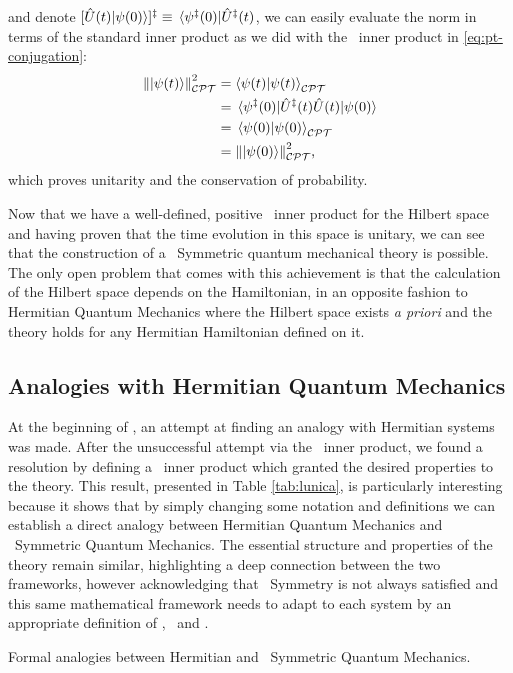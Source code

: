             and denote $\bqty*{\hU\pqty{t}\!\ket{\psi\pqty{0}}}\!^\myconj \equiv \bra*{\psi^\myconj\pqty{0}}\!\hU^\myconj\pqty{t}$, we can easily evaluate the norm in terms of the standard inner product as we did with the \PT\ inner product in \eqref{eq:pt-conjugation}:
            \begin{align*}
                \norm{\ket{\psi\pqty{t}}}^2_{\CPT}
                &= \braket{\psi{\pqty{t}}}{\psi\pqty{t}}_{\CPT} \\
                &= \bra*{\psi^\myconj\pqty{0}}\! \hU^\myconj\pqty{t} \hU\pqty{t} \!\ket{\psi\pqty{0}} \\
                &= \bra*{\psi\pqty{0}}\ket{\psi\pqty{0}}_{\CPT} \\
                &= \norm{\ket{\psi\pqty{0}}}^2_{\CPT}
                \mycomma
            \end{align*}
            which proves unitarity and the conservation of probability.

            Now that we have a well-defined, positive \CPT\ inner product for the Hilbert space and having proven that the time evolution in this space is unitary, we can see that the construction of a \PT\ Symmetric quantum mechanical theory is possible. The only open problem that comes with this achievement is that the calculation of the Hilbert space depends on the Hamiltonian, in an opposite fashion to Hermitian Quantum Mechanics where the Hilbert space exists \emph{a priori} and the theory holds for any Hermitian Hamiltonian defined on it.

        \subsection{Analogies with Hermitian Quantum Mechanics}
        At the beginning of , an attempt at finding an analogy with Hermitian systems was made. After the unsuccessful attempt via the \PT\ inner product, we found a resolution by defining a \CPT\ inner product which granted the desired properties to the theory. This result, presented in Table \ref{tab:lunica}, is particularly interesting because it shows that by simply changing some notation and definitions we can establish a direct analogy between Hermitian Quantum Mechanics and \PT\ Symmetric Quantum Mechanics. The essential structure and properties of the theory remain similar, highlighting a deep connection between the two frameworks, however acknowledging that \PT\ Symmetry is not always satisfied and this same mathematical framework needs to adapt to each system by an appropriate definition of \hC, \hP\ and \hT.
        \begin{table}
            \centering
            
            \caption{Formal analogies between Hermitian and \PT\ Symmetric Quantum Mechanics.}
            \label{tab:lunica}
        \end{table}